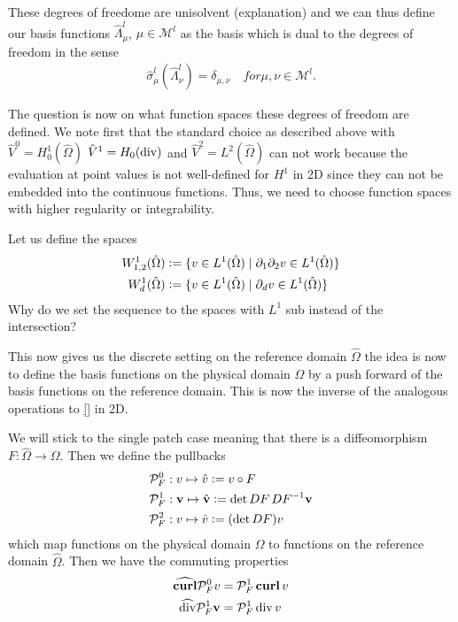 \documentclass[../master_thesis.tex]{subfiles}
\begin{document}
These degrees of freedome are unisolvent (explanation) and we can thus define our basis functions 
$\hat{\Lambda}^l_\mu$, $\mu \in \mathcal{M}^l$ as the basis which is dual to the 
degrees of freedom in the sense 
\begin{align*}
    \hat{\sigma}_\mu^l(\hat{\Lambda}^l_\nu) = \delta_{\mu,\nu} \quad for \mu, \nu \in \mathcal{M}^l.
\end{align*}

The question is now  on what function spaces these degrees of freedom are defined. We note first that 
the standard choice as described above with $\hat{V}^0 = H^1_0(\hat{\Omega})$ 
$\hat{V}^1 = H_0(\operatorname{div})$ and $\hat{V}^2 = L^2(\hat{\Omega})$ can not work 
because the evaluation at point values is not well-defined for $H^1$ in 2D since 
they can not be embedded into the continuous functions. Thus, 
we need to choose function spaces with higher regularity or integrability.

Let us define the spaces
\begin{align*}
    W^1_{1,2}(\hat{\Omega}) &\vcentcolon= \{ v \in L^1(\hat{\Omega}) \mid \partial_1 \partial_2 v
        \in L^1(\hat{\Omega}) \}
    \\  W^1_d(\hat{\Omega}) &\vcentcolon= \{ v \in L^1(\hat{\Omega}) \mid \partial_d v
        \in L^1(\hat{\Omega}) \}
\end{align*}
{\color{red} Why do we set the sequence to the spaces with $L^1$ sub instead of the intersection?}


This now gives us the discrete setting on the reference domain $\hat{\Omega}$ the idea 
is now to define the basis functions on the physical domain $\Omega$ by a 
push forward of the basis functions on the reference domain.
This is now the inverse of the analogous operations to 
\ref{} in 2D. 

We will stick to the single patch case meaning that there is a diffeomorphism 
$F: \hat{\Omega} \rightarrow \Omega$. Then we define 
the pullbacks 
\begin{align*}
    &\mathcal{P}_F^0: v \mapsto \hat{v} \vcentcolon= v \circ F
    \\ &\mathcal{P}_F^1: \mathbf{v} \mapsto \hat{\mathbf{v}} \vcentcolon= \det DF \,DF^{-1} \mathbf{v}
    \\ &\mathcal{P}_F^2: v \mapsto \hat{v} \vcentcolon= (\det DF) v
\end{align*}
which map functions on the physical domain $\Omega$ to functions on the reference domain 
$\hat{\Omega}$. Then we have the commuting properties
\begin{align*}
    \widehat{\veccurl} \mathcal{P}_F^0 v &= \mathcal{P}_F^1 \veccurl v
    \\ \widehat{\diver} \mathcal{P}_F^1 \mathbf{v} &= \mathcal{P}_F^1 \diver v
\end{align*}
\end{document}
